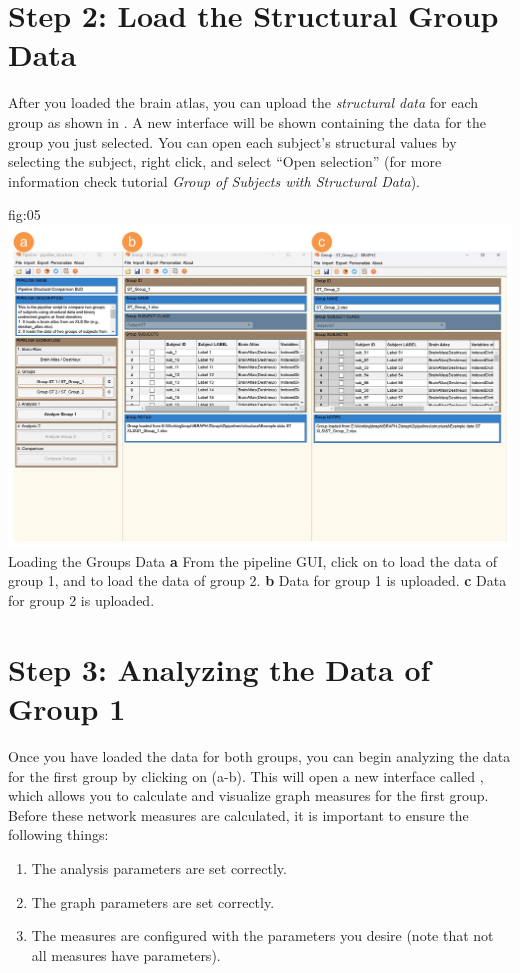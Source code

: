 \documentclass[justified]{tufte-handout}
\begin{document}
\section{Step 2: Load the Structural Group Data}

After you loaded the brain atlas, you can upload the \emph{structural data} for each group as shown in . A new interface will be shown containing the data for the group you just selected. You can open each subject’s structural values by selecting
the subject, right click, and select “Open selection” (for more information check tutorial \emph{Group of Subjects with Structural Data}).
	
	{fig:05}
	{
	\includegraphics{fig05.jpg}
	}
	{Loading the Groups Data}
	{
	{\bf a} From the pipeline GUI, click on  to load the data of group 1, and  to load the data of group 2.
	{\bf b} Data for group 1 is uploaded. {\bf c} Data for group 2 is uploaded.
	}

\section{Step 3: Analyzing the Data of Group 1}
 

Once you have loaded the data for both groups, you can begin analyzing the data for the first group by clicking on  (a-b). 
This will open a new interface called , which allows you to calculate and visualize graph measures for the first group. 
Before these network measures are calculated, it is important to ensure the following things: 
\begin{enumerate}
	\item The analysis parameters are set correctly.
	\item The graph parameters are set correctly.
	\item The measures are configured with the parameters you desire (note that not all measures have parameters).
\end{enumerate}
\end{document}
